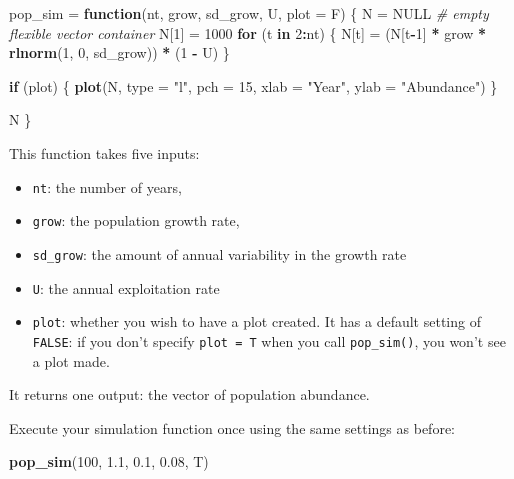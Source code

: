 \documentclass[]{book}
\newenvironment{Shaded}{\begin{snugshade}}{\end{snugshade}}
\newcommand{\KeywordTok}[1]{\textcolor[rgb]{0.13,0.29,0.53}{\textbf{#1}}}
\newcommand{\DataTypeTok}[1]{\textcolor[rgb]{0.13,0.29,0.53}{#1}}
\newcommand{\DecValTok}[1]{\textcolor[rgb]{0.00,0.00,0.81}{#1}}
\newcommand{\FloatTok}[1]{\textcolor[rgb]{0.00,0.00,0.81}{#1}}
\newcommand{\StringTok}[1]{\textcolor[rgb]{0.31,0.60,0.02}{#1}}
\newcommand{\CommentTok}[1]{\textcolor[rgb]{0.56,0.35,0.01}{\textit{#1}}}
\newcommand{\OtherTok}[1]{\textcolor[rgb]{0.56,0.35,0.01}{#1}}
\newcommand{\ControlFlowTok}[1]{\textcolor[rgb]{0.13,0.29,0.53}{\textbf{#1}}}
\newcommand{\OperatorTok}[1]{\textcolor[rgb]{0.81,0.36,0.00}{\textbf{#1}}}
\newcommand{\NormalTok}[1]{#1}
\providecommand{\tightlist}{%
  \setlength{\itemsep}{0pt}\setlength{\parskip}{0pt}}
\theoremstyle{definition}
\theoremstyle{definition}
\theoremstyle{definition}
\theoremstyle{remark}
\begin{document}
\begin{Shaded}
\begin{Highlighting}[]
\NormalTok{pop_sim =}\StringTok{ }\ControlFlowTok{function}\NormalTok{(nt, grow, sd_grow, U, }\DataTypeTok{plot =}\NormalTok{ F) \{}
\NormalTok{  N =}\StringTok{ }\OtherTok{NULL} \CommentTok{# empty flexible vector container}
\NormalTok{  N[}\DecValTok{1}\NormalTok{] =}\StringTok{ }\DecValTok{1000}
  \ControlFlowTok{for}\NormalTok{ (t }\ControlFlowTok{in} \DecValTok{2}\OperatorTok{:}\NormalTok{nt) \{}
\NormalTok{    N[t] =}\StringTok{ }\NormalTok{(N[t}\OperatorTok{-}\DecValTok{1}\NormalTok{] }\OperatorTok{*}\StringTok{ }\NormalTok{grow }\OperatorTok{*}\StringTok{ }\KeywordTok{rlnorm}\NormalTok{(}\DecValTok{1}\NormalTok{, }\DecValTok{0}\NormalTok{, sd_grow)) }\OperatorTok{*}\StringTok{ }\NormalTok{(}\DecValTok{1} \OperatorTok{-}\StringTok{ }\NormalTok{U)}
\NormalTok{  \}}
  
  \ControlFlowTok{if}\NormalTok{ (plot) \{}
    \KeywordTok{plot}\NormalTok{(N, }\DataTypeTok{type =} \StringTok{"l"}\NormalTok{, }\DataTypeTok{pch =} \DecValTok{15}\NormalTok{, }\DataTypeTok{xlab =} \StringTok{"Year"}\NormalTok{, }\DataTypeTok{ylab =} \StringTok{"Abundance"}\NormalTok{)}
\NormalTok{  \}}
  
\NormalTok{  N}
\NormalTok{\}}
\end{Highlighting}
\end{Shaded}

This function takes five inputs:

\begin{itemize}
\tightlist
\item
  \texttt{nt}: the number of years,
\item
  \texttt{grow}: the population growth rate,
\item
  \texttt{sd\_grow}: the amount of annual variability in the growth rate
\item
  \texttt{U}: the annual exploitation rate
\item
  \texttt{plot}: whether you wish to have a plot created. It has a
  default setting of \texttt{FALSE}: if you don't specify
  \texttt{plot\ =\ T} when you call \texttt{pop\_sim()}, you won't see a
  plot made.
\end{itemize}

It returns one output: the vector of population abundance.

Execute your simulation function once using the same settings as before:

\begin{Shaded}
\begin{Highlighting}[]
\KeywordTok{pop_sim}\NormalTok{(}\DecValTok{100}\NormalTok{, }\FloatTok{1.1}\NormalTok{, }\FloatTok{0.1}\NormalTok{, }\FloatTok{0.08}\NormalTok{, T)}
\end{Highlighting}
\end{Shaded}
\end{document}
